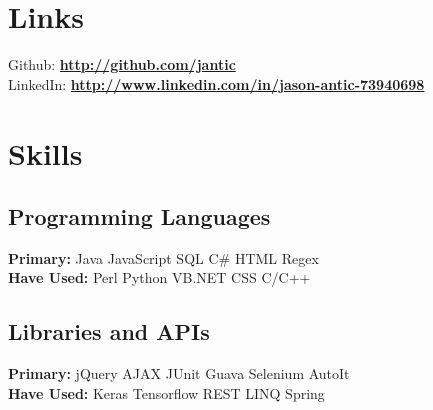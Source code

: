 \documentclass[letterpaper]{deedy-resume} %
\begin{document}
\begin{minipage}[t]{0.33\textwidth}

\sectionspace %


\section{Links} 

Github: \href{http://github.com/jantic}{\bf http://github.com/jantic} \\
LinkedIn: \href{http://www.linkedin.com/in/jason-antic-73940698/}{\bf http://www.linkedin.com/in/jason-antic-73940698} \\

\sectionspace %

\section{Skills}

\subsection{Programming Languages}
\textbf{Primary:}\newline 
Java \textbullet{} JavaScript \textbullet{} SQL \textbullet{} C\# \textbullet{} HTML \textbullet{} Regex \\ 
\textbf{Have Used:}\newline 
Perl \textbullet{} Python \textbullet{} VB.NET \textbullet{} CSS \textbullet{} C/C++ \\

\sectionspace %

\subsection{Libraries and APIs}

\textbf{Primary:}\newline 
jQuery \textbullet{} AJAX \textbullet{} JUnit \textbullet{} Guava \textbullet{} Selenium \textbullet{} AutoIt \\ 
\textbf{Have Used:}\newline 
Keras \textbullet{} Tensorflow \textbullet{} REST \textbullet{} LINQ \textbullet{} Spring \\
\sectionspace %


\end{minipage}
\end{document}

